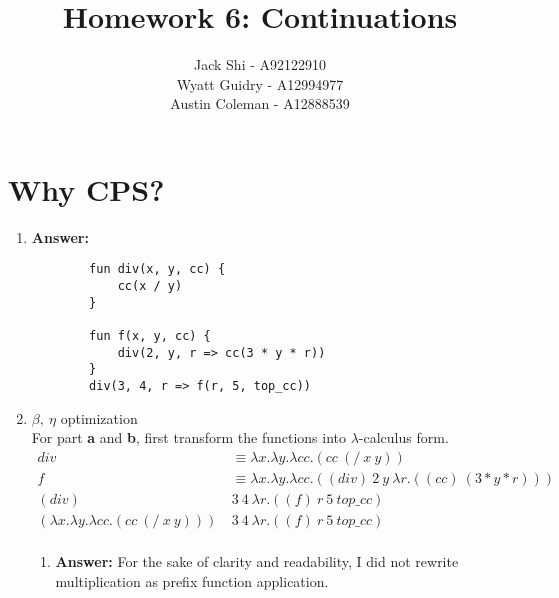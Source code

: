 \documentclass{article}
\title{Homework 6: Continuations}
\author{Jack Shi - A92122910 \\
				Wyatt Guidry - A12994977 \\
				Austin Coleman - A12888539}
\begin{document}
\maketitle

\section{Why CPS?}
\begin{enumerate}
	\item \textbf{Answer:}
	\begin{lstlisting}
		fun div(x, y, cc) {
			cc(x / y)
		}

		fun f(x, y, cc) {
			div(2, y, r => cc(3 * y * r))
		}
		div(3, 4, r => f(r, 5, top_cc))
	\end{lstlisting}

	\item $\beta,\ \eta$ optimization\\
		For part \textbf{a} and \textbf{b}, first transform the functions into
		$\lambda$-calculus form.
		\begin{align*}
		div &\equiv \lambda x.\lambda y. \lambda cc.(cc\ (/\ x\ y))\\
		f &\equiv \lambda x.\lambda y. \lambda cc.((div)\ 2\ y\ \lambda r.((cc)\
		(3*y*r)))\\
		(div)\ &3\ 4\ \lambda r.((f)\ r\ 5\ top\_cc)\\
		(\lambda x.\lambda y. \lambda cc.(cc\ (/\ x\ y)))\ &3\ 4\ \lambda r.((f)\ r\ 5\
		top\_cc)\\
		\end{align*}
		\begin{enumerate}
			\item \textbf{Answer:} For the sake of clarity and readability, I did not
				rewrite multiplication as prefix function application.


\end{enumerate}
\end{enumerate}
\end{document}
